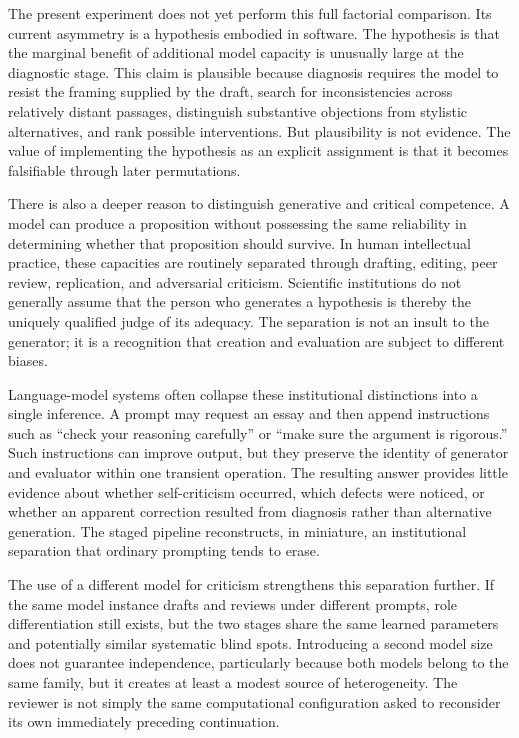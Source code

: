 \documentclass[11pt]{article}
\begin{document}
The present experiment does not yet perform this full factorial comparison. Its current asymmetry is a hypothesis embodied in software. The hypothesis is that the marginal benefit of additional model capacity is unusually large at the diagnostic stage. This claim is plausible because diagnosis requires the model to resist the framing supplied by the draft, search for inconsistencies across relatively distant passages, distinguish substantive objections from stylistic alternatives, and rank possible interventions. But plausibility is not evidence. The value of implementing the hypothesis as an explicit assignment is that it becomes falsifiable through later permutations.

There is also a deeper reason to distinguish generative and critical competence. A model can produce a proposition without possessing the same reliability in determining whether that proposition should survive. In human intellectual practice, these capacities are routinely separated through drafting, editing, peer review, replication, and adversarial criticism. Scientific institutions do not generally assume that the person who generates a hypothesis is thereby the uniquely qualified judge of its adequacy. The separation is not an insult to the generator; it is a recognition that creation and evaluation are subject to different biases.

Language-model systems often collapse these institutional distinctions into a single inference. A prompt may request an essay and then append instructions such as ``check your reasoning carefully'' or ``make sure the argument is rigorous.'' Such instructions can improve output, but they preserve the identity of generator and evaluator within one transient operation. The resulting answer provides little evidence about whether self-criticism occurred, which defects were noticed, or whether an apparent correction resulted from diagnosis rather than alternative generation. The staged pipeline reconstructs, in miniature, an institutional separation that ordinary prompting tends to erase.

The use of a different model for criticism strengthens this separation further. If the same model instance drafts and reviews under different prompts, role differentiation still exists, but the two stages share the same learned parameters and potentially similar systematic blind spots. Introducing a second model size does not guarantee independence, particularly because both models belong to the same family, but it creates at least a modest source of heterogeneity. The reviewer is not simply the same computational configuration asked to reconsider its own immediately preceding continuation.
\end{document}

